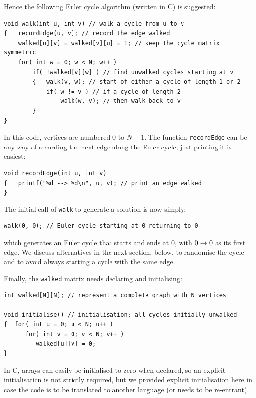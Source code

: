 \documentclass[prodmode,acmtecs]{acmsmall} %
\begin{document}
Hence the following Euler cycle algorithm (written in C) is suggested:
 
\begin{Verbatim}
void walk(int u, int v) // walk a cycle from u to v
{   recordEdge(u, v); // record the edge walked
    walked[u][v] = walked[v][u] = 1; // keep the cycle matrix symmetric
    for( int w = 0; w < N; w++ )
        if( !walked[v][w] ) // find unwalked cycles starting at v
        {   walk(v, w); // start of either a cycle of length 1 or 2
            if( w != v ) // if a cycle of length 2
                walk(w, v); // then walk back to v
        } 
}
\end{Verbatim}

In this code, vertices are numbered $0$ to $N-1$. The function \texttt{recordEdge} can be any way of recording the next edge along the Euler cycle; just printing it is easiest:

\begin{Verbatim}
void recordEdge(int u, int v) 
{   printf("%d --> %d\n", u, v); // print an edge walked
}
\end{Verbatim}

The initial call of \texttt{walk} to generate a solution is now simply:  

\begin{Verbatim}      
walk(0, 0); // Euler cycle starting at 0 returning to 0
\end{Verbatim}

which generates an Euler cycle that starts and ends at 0, with $\pair 00$ as its first edge. We discuss alternatives in the next section, below, to randomise the cycle and to avoid always starting a cycle with the same edge.

Finally, the \texttt{walked} matrix needs declaring and initialising: 

\begin{Verbatim}
int walked[N][N]; // represent a complete graph with N vertices

void initialise() // initialisation; all cycles initially unwalked
{  for( int u = 0; u < N; u++ )
      for( int v = 0; v < N; v++ )
         walked[u][v] = 0; 
}
\end{Verbatim}

In C, arrays can easily be initialised to zero when declared, so an explicit initialisation is not strictly required, but we provided explicit initialisation here in case the code is to be translated to another language (or needs to be re-entrant). 
\end{document}

